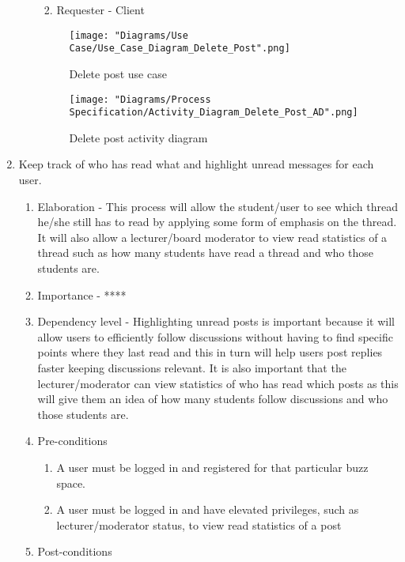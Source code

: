 \documentclass[12pt]{article}
\begin{document}
\begin{enumerate}
\begin{enumerate}
\begin{enumerate}
\begin{enumerate}
   	 		\end{enumerate}
   	 		\item Requester - Client
  		\end{enumerate}
  	\begin{figure}[h]
  		\centering
  		\texttt{[image: "Diagrams/Use Case/Use\_Case\_Diagram\_Delete\_Post".png]}
  		\caption{Delete post use case}
  	\end{figure}
  	\begin{figure}[h]
  		\centering
  		\texttt{[image: "Diagrams/Process Specification/Activity\_Diagram\_Delete\_Post\_AD".png]}
  		\caption{Delete post activity diagram}
  	\end{figure}
  	\clearpage
  	\end{enumerate}
\newpage %
  \item Keep track of who has read what and highlight unread messages for each user. %
  \begin{enumerate}
    \item Elaboration - This process will allow the student/user to see which thread he/she still has to read by applying some form of emphasis on the thread. It will also allow a lecturer/board moderator to view read statistics of a thread such as how many students have read a thread and who those students are.
    \item Importance - ****
    \item Dependency level - Highlighting unread posts is important because it will allow users to efficiently follow discussions without having to find specific points where they last read and this in turn will help users post replies faster keeping discussions relevant. It is also important that the lecturer/moderator can view statistics of who has read which posts as this will give them an idea of how many students follow discussions and who those students are.
    \item Pre-conditions
    \begin{enumerate}
    	\item A user must be logged in and registered for that particular buzz space.
    	\item A user must be logged in and have elevated privileges, such as lecturer/moderator status, to view read statistics of a post
    \end{enumerate}
        \item Post-conditions

\end{enumerate}
\end{enumerate}
\end{document}
